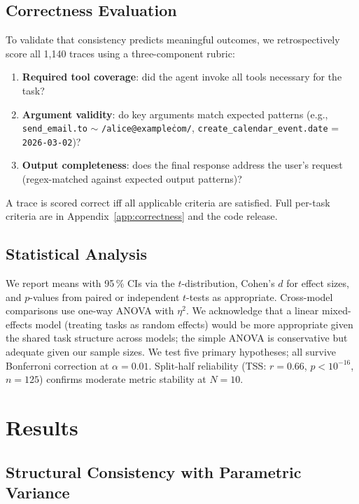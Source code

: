 \documentclass[letterpaper]{article}
\begin{document}
\subsection{Correctness Evaluation}
\label{sec:correctness_method}

To validate that consistency predicts meaningful outcomes, we retrospectively score
all 1,140 traces using a three-component rubric:
\begin{enumerate}[leftmargin=1.5em]
  \item \textbf{Required tool coverage}: did the agent invoke all tools necessary
    for the task?
  \item \textbf{Argument validity}: do key arguments match expected patterns
    (e.g., \texttt{send\_email.to} $\sim$ \texttt{/alice@example\.com/},
    \texttt{create\_calendar\_event.date} = \texttt{2026-03-02})?
  \item \textbf{Output completeness}: does the final response address the user's
    request (regex-matched against expected output patterns)?
\end{enumerate}
A trace is scored correct iff all applicable criteria are satisfied. Full per-task
criteria are in Appendix~\ref{app:correctness} and the code release.

\subsection{Statistical Analysis}

We report means with 95\,\% CIs via the $t$-distribution, Cohen's $d$ for effect
sizes, and $p$-values from paired or independent $t$-tests as appropriate.
Cross-model comparisons use one-way ANOVA with $\eta^2$. We acknowledge that a
linear mixed-effects model (treating tasks as random effects) would be more
appropriate given the shared task structure across models; the simple ANOVA is
conservative but adequate given our sample sizes. We test five primary hypotheses;
all survive Bonferroni correction at $\alpha = 0.01$. Split-half reliability (TSS:
$r = 0.66$, $p < 10^{-16}$, $n = 125$) confirms moderate metric stability at
$N = 10$.

\section{Results}

\subsection{Structural Consistency with Parametric Variance}
\label{sec:structural}
\end{document}

